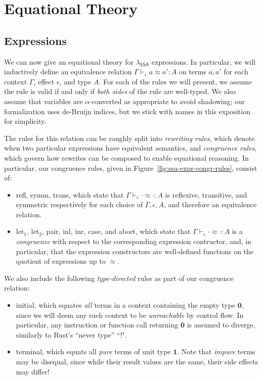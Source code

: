 \documentclass[acmsmall,screen,review]{acmart}
\newcommand{\mb}[1]{\ensuremath{\mathbf{#1}}}
\newcommand{\ms}[1]{\ensuremath{\mathsf{#1}}}
\newcommand{\teqv}{\approx}
\newcommand{\tmeq}[5]{#1 \vdash_{#2} #3 \teqv #4 : {#5}}
\newcommand{\brle}[1]{{\scriptsize\textsf{#1}}}
\newcommand{\isotopessa}{\(\lambda_{\ms{SSA}}\)}
\begin{document}
\section{Equational Theory}

\label{sec:equations}

\subsection{Expressions}

We can now give an equational theory for \isotopessa{} expressions. In particular,
we will inductively define an equivalence relation
$
\tmeq{\Gamma}{\epsilon}{a}{a'}{A}
$
on terms $a, a'$ for each context $\Gamma$, effect $\epsilon$, and type $A$. For each of the rules
we will present, we assume the rule is valid if and only if \emph{both sides} of the rule are
well-typed. We also assume that variables are $\alpha$-converted as appropriate to avoid shadowing;
our formalization uses de-Bruijn indices, but we stick with names in this exposition for simplicity.

The rules for this relation can be roughly split into \emph{rewriting rules}, which denote when two
particular expressions have equivalent semantics, and \emph{congruence rules}, which govern how
rewrites can be composed to enable equational reasoning. In particular, our congruence rules, given
in Figure~\ref{fig:ssa-expr-congr-rules}, consist of:
\begin{itemize}
  \item \brle{refl}, \brle{symm}, \brle{trans}, which state that
  $\tmeq{\Gamma}{\epsilon}{\cdot}{\cdot}{A}$ is reflexive, transitive, and symmetric respectively
  for each choice of $\Gamma, \epsilon, A$, and therefore an equivalence relation.
  \item \brle{let$_1$}, \brle{let$_2$}, \brle{pair}, \brle{inl}, \brle{inr}, \brle{case}, and
  \brle{abort}, which state that $\tmeq{\Gamma}{\epsilon}{\cdot}{\cdot}{A}$ is a \emph{congruence}
  with respect to the corresponding expression contructor, and, in particular, that the expression
  constructors are well-defined functions on the quotient of expressions up to $\teqv$.
\end{itemize} 
We also include the following \emph{type-directed} rules as part of our congruence relation:
\begin{itemize}
  \item \brle{initial}, which equates \emph{all} terms in a context containing the empty type
  $\mb{0}$, since we will deem any such context to be \emph{unreachable} by control flow. In
  particular, any instruction or function call returning $\mb{0}$ is assumed to diverge, similarly
  to Rust's ``never type'' ``$!$".
  \item \brle{terminal}, which equats all \emph{pure} terms of unit type $\mb{1}$. Note that
  \emph{impure} terms may be disequal, since while their result values are the same, their side
  effects may differ!
\end{itemize}
\end{document}
